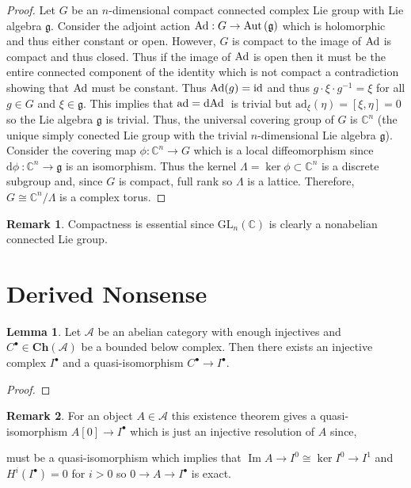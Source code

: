 \documentclass[12pt]{extarticle}
\DeclareMathOperator{\im}{\mathrm{Im}}
\newcommand{\id}{\mathrm{id}}
\renewcommand{\d}[1]{ \mathrm{d}#1 \:}
\theoremstyle{definition}
\newtheorem{lemma}[theorem]{Lemma}
\newtheorem{remark}{Remark}
\newcommand{\g}{\mathfrak{g}}
\newcommand{\Aut}[1]{\mathrm{Aut}\left(#1 \right)}
\newcommand{\C}{\mathbb{C}}
\newcommand{\ad}{\mathrm{ad}}
\newcommand{\A}{\mathbb{A}}
\begin{document}
\begin{proof}
Let $G$ be an $n$-dimensional compact connected complex Lie group with Lie algebra $\g$. Consider the adjoint action $\Ad : G \to \Aut{\g}$ which is holomorphic and thus either constant or open. However, $G$ is compact to the image of $\mathrm{Ad}$ is compact and thus closed. Thus if the image of $\mathrm{Ad}$ is open then it must be the entire connected component of the identity which is not compact a contradiction showing that $\mathrm{Ad}$ must be constant. Thus $\Ad{(g)} = \id$ and thus $g \cdot \xi \cdot g^{-1} = \xi$ for all $g \in G$ and $\xi \in \g$. This implies that $\ad = \d{\Ad}$ is trivial but $\ad_{\xi}(\eta) = [\xi, \eta] = 0$ so the Lie algebra $\g$ is trivial. Thus, the universal covering group of $G$ is $\C^n$ (the unique simply conected Lie group with the trivial $n$-dimensional Lie algebra $\g$). Consider the covering map $\phi : \C^n \to G$ which is a local diffeomorphism since $\d{\phi} : \C^n \to \g$ is an isomorphism. Thus the kernel $\Lambda = \ker{\phi} \subset \C^n$ is a discrete subgroup and, since $G$ is compact, full rank so $\Lambda$ is a lattice. Therefore, $G \cong \C^n / \Lambda$ is a complex torus.
\end{proof}

\begin{remark}
Compactness is essential since $\mathrm{GL}_{n}(\C)$ is clearly a nonabelian  connected Lie group. 
\end{remark}


\section{Derived Nonsense}

\newcommand{\Ch}[1]{\mathbf{Ch}\left( #1 \right)}
\renewcommand{\A}{\mathcal{A}}

\begin{lemma}
Let $\A$ be an abelian category with enough injectives and $C^\bullet \in \Ch{\A}$ be a bounded below complex. Then there exists an injective complex $I^\bullet$ and a quasi-isomorphism $C^\bullet \to I^\bullet$. 
\end{lemma}

\begin{proof}

\end{proof}

\begin{remark}
For an object $A \in \A$ this existence theorem gives a quasi-isomorphism $A[0] \to I^\bullet$ which is just an injective resolution of $A$ since,
\begin{center}
\end{center}
must be a quasi-isomorphism which implies that $\im{A \to I^0} \cong \ker{I^0 \to I^1}$ and $H^i(I^\bullet) = 0$ for $i > 0$ so $0 \to A \to I^\bullet$ is exact.
\end{remark}
\end{document}

